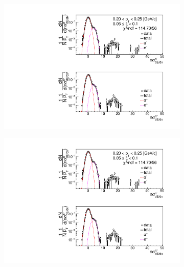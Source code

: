 \begin{figure}[h!]
\begin{subfigure}{.33\textwidth}
	\end{subfigure}
	\begin{subfigure}{.3\textwidth}
		\includegraphics[width=\linewidth, page=3]{chapters/chrgSTAR/img/dEdx/fit2019_secondStep_0_1.pdf}
	\end{subfigure}
	\begin{subfigure}{.33\textwidth}
		\includegraphics[width=\linewidth, page=4]{chapters/chrgSTAR/img/dEdx/fit2019_secondStep_0_1.pdf}
	\end{subfigure}
	\begin{subfigure}{.33\textwidth}

\end{subfigure}
\end{figure}
